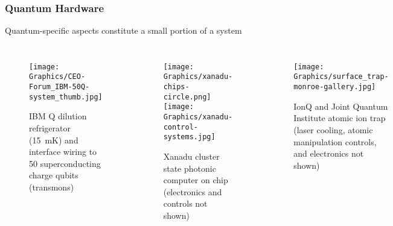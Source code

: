 

\begin{frame}
  \frametitle{Quantum Hardware}
  Quantum-specific aspects constitute a small portion of a system
  \begin{columns}
    \begin{figure}
      \centering
    \texttt{[image: Graphics/CEO-Forum\_IBM-50Q-system\_thumb.jpg]}
      \caption{IBM Q dilution refrigerator (\SI{15}{\milli\kelvin}) and interface wiring to 50 superconducting charge qubits (transmons)~\cite{IBMQ-blog}}
    \end{figure}

    \begin{figure}
      \centering
      \caption{Xanadu cluster state photonic computer on chip (electronics
        and controls not shown)~\cite{Xanadu-Hardware}}
      \texttt{[image: Graphics/xanadu-chips-circle.png]}    
      \texttt{[image: Graphics/xanadu-control-systems.jpg]}
    \end{figure}    %
    \begin{figure}
      \centering
      \texttt{[image: Graphics/surface\_trap-monroe-gallery.jpg]}
      \caption{IonQ and Joint Quantum Institute atomic ion trap (laser
        cooling, atomic manipulation controls, and electronics not
        shown)~\cite{JQI-15M-NSF-news}}
    \end{figure}
  \end{columns}
\end{frame}

